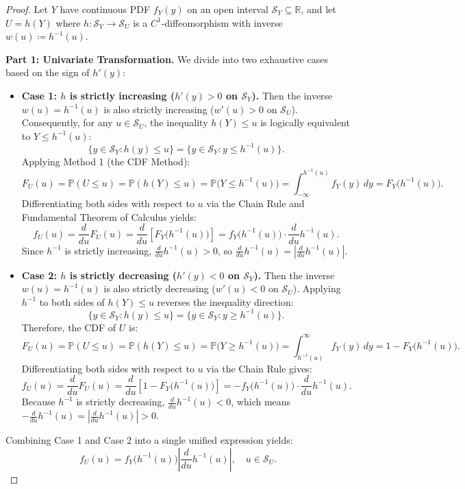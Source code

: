 \documentclass[11pt, letterpaper]{article}
\theoremstyle{definition}
\theoremstyle{remark}
\newcommand{\R}{\mathbb{R}}
\newcommand{\Prob}{\mathbb{P}}
\begin{document}
\begin{proof}
Let $Y$ have continuous PDF $f_Y(y)$ on an open interval $\mathcal{S}_Y \subseteq \R$, and let $U = h(Y)$ where $h: \mathcal{S}_Y \to \mathcal{S}_U$ is a $C^1$-diffeomorphism with inverse $w(u) \coloneqq h^{-1}(u)$.

\textbf{Part 1: Univariate Transformation.} We divide into two exhaustive cases based on the sign of $h'(y)$:
\begin{itemize}
    \item \textbf{Case 1: $h$ is strictly increasing ($h'(y) > 0$ on $\mathcal{S}_Y$).} Then the inverse $w(u) = h^{-1}(u)$ is also strictly increasing ($w'(u) > 0$ on $\mathcal{S}_U$). Consequently, for any $u \in \mathcal{S}_U$, the inequality $h(Y) \le u$ is logically equivalent to $Y \le h^{-1}(u)$:
    \[
        \{y \in \mathcal{S}_Y : h(y) \le u\} = \{y \in \mathcal{S}_Y : y \le h^{-1}(u)\}.
    \]
    Applying Method 1 (the CDF Method):
    \[
        F_U(u) = \Prob(U \le u) = \Prob(h(Y) \le u) = \Prob\big(Y \le h^{-1}(u)\big) = \int_{-\infty}^{h^{-1}(u)} f_Y(y) \, dy = F_Y\big(h^{-1}(u)\big).
    \]
    Differentiating both sides with respect to $u$ via the Chain Rule and Fundamental Theorem of Calculus yields:
    \[
        f_U(u) = \frac{d}{du} F_U(u) = \frac{d}{du} \left[ F_Y\big(h^{-1}(u)\big) \right] = f_Y\big(h^{-1}(u)\big) \cdot \frac{d}{du} h^{-1}(u).
    \]
    Since $h^{-1}$ is strictly increasing, $\frac{d}{du}h^{-1}(u) > 0$, so $\frac{d}{du}h^{-1}(u) = \left|\frac{d}{du}h^{-1}(u)\right|$.

    \item \textbf{Case 2: $h$ is strictly decreasing ($h'(y) < 0$ on $\mathcal{S}_Y$).} Then the inverse $w(u) = h^{-1}(u)$ is also strictly decreasing ($w'(u) < 0$ on $\mathcal{S}_U$). Applying $h^{-1}$ to both sides of $h(Y) \le u$ reverses the inequality direction:
    \[
        \{y \in \mathcal{S}_Y : h(y) \le u\} = \{y \in \mathcal{S}_Y : y \ge h^{-1}(u)\}.
    \]
    Therefore, the CDF of $U$ is:
    \[
        F_U(u) = \Prob(U \le u) = \Prob(h(Y) \le u) = \Prob\big(Y \ge h^{-1}(u)\big) = \int_{h^{-1}(u)}^{\infty} f_Y(y) \, dy = 1 - F_Y\big(h^{-1}(u)\big).
    \]
    Differentiating both sides with respect to $u$ via the Chain Rule gives:
    \[
        f_U(u) = \frac{d}{du} F_U(u) = \frac{d}{du}\left[1 - F_Y\big(h^{-1}(u)\big)\right] = -f_Y\big(h^{-1}(u)\big) \cdot \frac{d}{du} h^{-1}(u).
    \]
    Because $h^{-1}$ is strictly decreasing, $\frac{d}{du}h^{-1}(u) < 0$, which means $-\frac{d}{du}h^{-1}(u) = \left|\frac{d}{du}h^{-1}(u)\right| > 0$.
\end{itemize}
Combining Case 1 and Case 2 into a single unified expression yields:
\[
    f_U(u) = f_Y\big(h^{-1}(u)\big) \left| \frac{d}{du} h^{-1}(u) \right|, \quad u \in \mathcal{S}_U.
\]


\end{proof}
\end{document}
